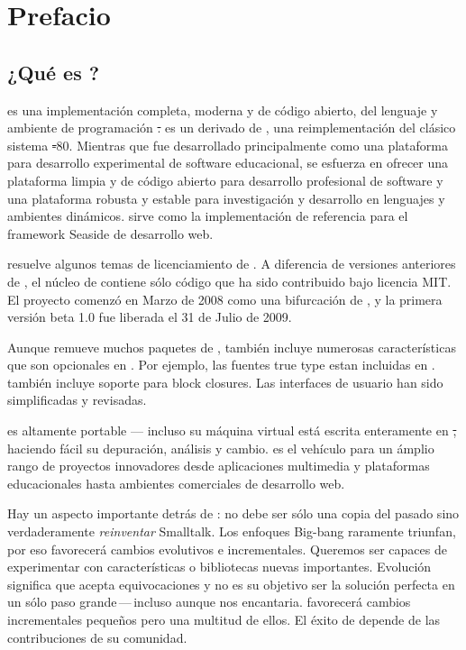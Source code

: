 \documentclass[a4paper,spanish, 10pt,twoside]{book}
\begin{document}
	\sloppy
	\frontmatter
\fi
\chapter{Prefacio}

\section*{¿Qué es \pharo?}

\pharo es una implementación completa, moderna y de código abierto, del lenguaje y ambiente de programación \st. \pharo es un derivado de \squeak\cite{Inga97a}, una reimplementación del clásico sistema \st-80. Mientras que \squeak fue desarrollado principalmente como una plataforma para desarrollo experimental de software educacional, \pharo se esfuerza en ofrecer una plataforma limpia y de código abierto para desarrollo profesional de software y una plataforma robusta y estable para investigación y desarrollo en lenguajes y ambientes dinámicos. \pharo sirve como la implementación de referencia para el framework Seaside de desarrollo web.

\pharo resuelve algunos temas de licenciamiento de \squeak. A diferencia de versiones anteriores de \squeak, el núcleo de \pharo contiene sólo código que ha sido contribuido bajo licencia MIT. El proyecto \pharo comenzó en Marzo de 2008 como una bifurcación de , y la primera versión beta 1.0 fue liberada el 31 de Julio de 2009.


Aunque \pharo remueve muchos paquetes de \squeak, también incluye numerosas características que son opcionales en \squeak. Por ejemplo, las fuentes true type estan incluidas en \pharo. \pharo también incluye soporte para block closures. Las interfaces de usuario han sido simplificadas y revisadas.

\pharo es altamente portable --- incluso su máquina virtual está escrita enteramente en \st, haciendo fácil su depuración, análisis y cambio. \pharo es el vehículo para un ámplio rango de proyectos innovadores desde aplicaciones multimedia y plataformas educacionales hasta ambientes comerciales de desarrollo web. 

Hay un aspecto importante detrás de \pharo: \pharo no debe ser sólo una copia del pasado sino verdaderamente \emph{reinventar} Smalltalk. Los enfoques Big-bang raramente triunfan, por eso \pharo favorecerá  cambios evolutivos e incrementales. Queremos ser capaces de experimentar con características o bibliotecas nuevas importantes. Evolución significa que \pharo acepta equivocaciones y no es su objetivo ser la solución perfecta en un sólo paso grande\,---\,incluso aunque nos encantaria. \pharo favorecerá cambios incrementales pequeños pero una multitud de ellos. El éxito de \pharo depende de las contribuciones de su comunidad.
\end{document}
